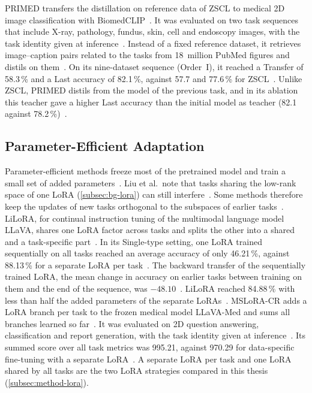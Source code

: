 PRIMED transfers the distillation on reference data of ZSCL to medical 2D image classification with BiomedCLIP~\cite{chen2025forgingdynamicmemoryretrievalguided}.
It was evaluated on two task sequences that include X-ray, pathology, fundus, skin, cell and endoscopy images, with the task identity given at inference~\cite{chen2025forgingdynamicmemoryretrievalguided}.
Instead of a fixed reference dataset, it retrieves image--caption pairs related to the tasks from 18~million PubMed figures and distils on them~\cite{chen2025forgingdynamicmemoryretrievalguided}.
On its nine-dataset sequence (Order~I), it reached a Transfer of 58.3\,\% and a Last accuracy of 82.1\,\%, against 57.7 and 77.6\,\% for ZSCL~\cite{chen2025forgingdynamicmemoryretrievalguided}.
Unlike ZSCL, PRIMED distils from the model of the previous task, and in its ablation this teacher gave a higher Last accuracy than the initial model as teacher (82.1 against 78.2\,\%)~\cite{chen2025forgingdynamicmemoryretrievalguided}.

\subsection{Parameter-Efficient Adaptation}

Parameter-efficient methods freeze most of the pretrained model and train a small set of added parameters~\cite[Sec.~4.3]{liu2026continuallearningvlmssurvey}.
Liu et al.\ note that tasks sharing the low-rank space of one LoRA (\cref{subsec:bg-lora}) can still interfere~\cite[Sec.~4.3]{liu2026continuallearningvlmssurvey}.
Some methods therefore keep the updates of new tasks orthogonal to the subspaces of earlier tasks~\cite[Sec.~4.3]{liu2026continuallearningvlmssurvey}.
LiLoRA, for continual instruction tuning of the multimodal language model LLaVA, shares one LoRA factor across tasks and splits the other into a shared and a task-specific part~\cite{che2026loraloraparameterefficientarchitecture}.
In its Single-type setting, one LoRA trained sequentially on all tasks reached an average accuracy of only 46.21\,\%, against 88.13\,\% for a separate LoRA per task~\cite{che2026loraloraparameterefficientarchitecture}.
The backward transfer of the sequentially trained LoRA, the mean change in accuracy on earlier tasks between training on them and the end of the sequence, was $-48.10$~\cite{che2026loraloraparameterefficientarchitecture}.
LiLoRA reached 84.88\,\% with less than half the added parameters of the separate LoRAs~\cite{che2026loraloraparameterefficientarchitecture}.
MSLoRA-CR adds a LoRA branch per task to the frozen medical model LLaVA-Med and sums all branches learned so far~\cite{Zhang_2025}.
It was evaluated on 2D question answering, classification and report generation, with the task identity given at inference~\cite{Zhang_2025}.
Its summed score over all task metrics was 995.21, against 970.29 for data-specific fine-tuning with a separate LoRA~\cite{Zhang_2025}.
A separate LoRA per task and one LoRA shared by all tasks are the two LoRA strategies compared in this thesis (\cref{subsec:method-lora}).

